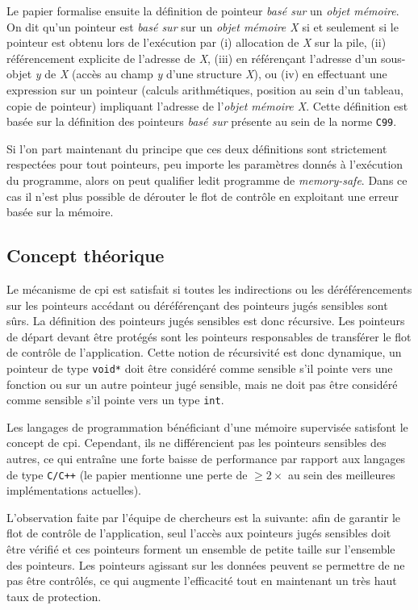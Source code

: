 Le papier formalise ensuite la définition de pointeur \textit{basé sur} un \textit{objet mémoire}. On dit qu'un pointeur est \textit{basé sur} sur un \textit{objet mémoire X} si et seulement si le pointeur est obtenu lors de l'exécution par (i) allocation de \textit{X} sur la pile, (ii) référencement explicite de l'adresse de \textit{X}, (iii) en référençant l'adresse d'un sous-objet \textit{y} de \textit{X} (accès au champ \textit{y} d'une structure \textit{X}), ou (iv) en effectuant une expression sur un pointeur (calculs arithmétiques, position au sein d'un tableau, copie de pointeur) impliquant l'adresse de l'\textit{objet mémoire X}. Cette définition est basée sur la définition des pointeurs \textit{basé sur} présente au sein de la norme \texttt{C99}.

\newpage

Si l'on part maintenant du principe que ces deux définitions sont strictement respectées pour tout pointeurs, peu importe les paramètres donnés à l'exécution du programme, alors on peut qualifier ledit programme de \textit{memory-safe}. Dans ce cas il n'est plus possible de dérouter le flot de contrôle en exploitant une erreur basée sur la mémoire.

\subsection{Concept théorique}

Le mécanisme de \gls{cpi} est satisfait si toutes les indirections ou les déréférencements sur les pointeurs accédant ou déréférençant des pointeurs jugés \og sensibles \fg sont sûrs. La définition des pointeurs jugés sensibles est donc récursive. Les pointeurs de départ devant être protégés sont les pointeurs responsables de transférer le flot de contrôle de l'application. Cette notion de récursivité est donc dynamique, un pointeur de type \texttt{void*} doit être considéré comme sensible s'il pointe vers une fonction ou sur un autre pointeur jugé sensible, mais ne doit pas être considéré comme sensible s'il pointe vers un type \texttt{int}.

Les langages de programmation bénéficiant d'une mémoire supervisée satisfont le concept de \gls{cpi}. Cependant, ils ne différencient pas les pointeurs sensibles des autres, ce qui entraîne une forte baisse de performance par rapport aux langages de type \texttt{C/C++} (le papier mentionne une perte de $\geq2\times$ au sein des meilleures implémentations actuelles).

L'observation faite par l'équipe de chercheurs est la suivante: afin de garantir le flot de contrôle de l'application, seul l'accès aux pointeurs jugés sensibles doit être vérifié et ces pointeurs forment un ensemble de petite taille sur l'ensemble des pointeurs. Les pointeurs agissant sur les données peuvent se permettre de ne pas être contrôlés, ce qui augmente l'efficacité tout en maintenant un très haut taux de protection.

